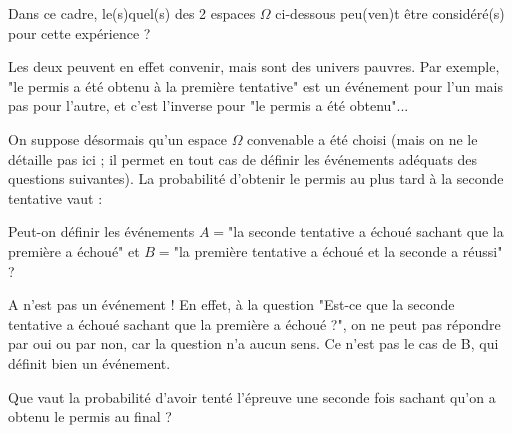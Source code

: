 \begin{question}
Dans ce cadre, le(s)quel(s) des 2 espaces $\Omega$ ci-dessous peu(ven)t être considéré(s) pour cette expérience ?
\begin{answers}
\end{answers}
\begin{explanations}
Les deux peuvent en effet convenir, mais sont des univers pauvres. Par exemple, "le permis a été obtenu à la première tentative" est un événement pour l'un mais pas pour l'autre, et c'est l'inverse pour "le permis a été obtenu"...
\end{explanations}
\end{question}


\begin{question}
On suppose désormais qu'un espace $\Omega$ convenable a été choisi (mais on ne le détaille pas ici ; il permet en tout cas de définir les événements adéquats des questions suivantes). La probabilité d'obtenir le permis au plus tard à la seconde tentative vaut :
\begin{answers}
\end{answers}
\end{question}


\begin{question}
Peut-on définir les événements $A=$"la seconde tentative a échoué sachant que la première a échoué"
et $B=$"la première tentative a échoué et la seconde a réussi" ?
\begin{answers}
\end{answers}
\begin{explanations}
A n'est pas un événement ! En effet, à la question "Est-ce que la seconde tentative a échoué sachant que la première a échoué ?", on ne peut pas répondre par oui ou par non, car la question n'a aucun sens. Ce n'est pas le cas de B, qui définit bien un événement.
\end{explanations}
\end{question}


\begin{question}
Que vaut la probabilité d'avoir tenté l'épreuve une seconde fois sachant qu'on a obtenu le permis au final ?
\begin{answers}
\end{answers}
\end{question}


